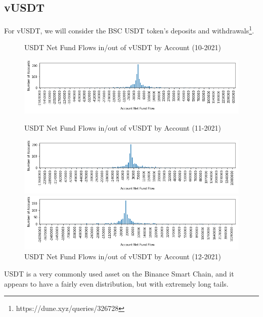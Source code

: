 \documentclass[12pt]{article}
\begin{document}
        \subsection*{vUSDT}
            For vUSDT, we will consider the BSC USDT token's deposits and withdrawals\footnote{https://dune.xyz/queries/326728}.
            \begin{figure}[h]
                \caption{USDT Net Fund Flows in/out of vUSDT by Account (10-2021) \label{overflow}}
                \centering
                \hspace*{-1in}
                \includegraphics[width=0.8\paperwidth]{net-fundflow-accountdist-vUSDT-10-2021.png}

                \caption{USDT Net Fund Flows in/out of vUSDT by Account (11-2021) \label{overflow}}
                \centering
                \hspace*{-1in}
                \includegraphics[width=0.8\paperwidth]{net-fundflow-accountdist-vUSDT-11-2021.png}

                \caption{USDT Net Fund Flows in/out of vUSDT by Account (12-2021) \label{overflow}}
                \centering
                \hspace*{-1in}
                \includegraphics[width=0.8\paperwidth]{net-fundflow-accountdist-vUSDT-12-2021.png}
            \end{figure}

            USDT is a very commonly used asset on the Binance Smart Chain, and it appears to have a fairly even distribution, but with extremely long tails.
            \clearpage
\end{document}
